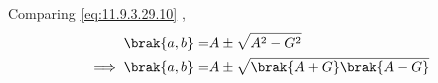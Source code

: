 \documentclass[journal,12pt,twocolumn]{IEEEtran}
\begin{document}
\noindent Comparing \eqref{eq:11.9.3.29.10} ,  
\begin{align}
\brak{a,b} =& A \pm \sqrt{A^2 - G^2} \\
\implies \brak{a,b} =& A \pm \sqrt{\brak{A + G}\brak{A - G}}
\end{align}




\end{document}
